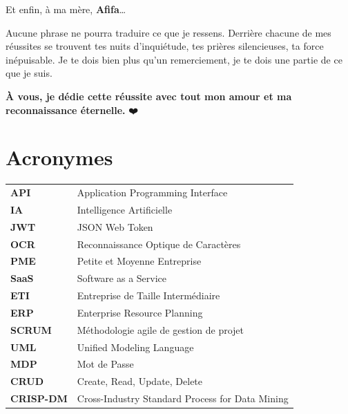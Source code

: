 \documentclass[12pt,a4paper]{report}
\begin{document}
\begin{center}
\vspace{0.3cm}

Et enfin, à ma mère, \textbf{Afifa}…

Aucune phrase ne pourra traduire ce que je ressens. Derrière chacune de mes réussites se trouvent tes nuits d’inquiétude, tes prières silencieuses, ta force inépuisable. Je te dois bien plus qu’un remerciement, je te dois une partie de ce que je suis.

\vspace{0.3cm}

\textbf{À vous, je dédie cette réussite avec tout mon amour et ma reconnaissance éternelle.} ❤️

\end{center}

\clearpage

\tableofcontents
\clearpage
\listoffigures
\clearpage
\listoftables
\clearpage

\chapter*{Acronymes}
\begin{tabular}{ll}
\textbf{API} & Application Programming Interface \\
\textbf{IA} & Intelligence Artificielle \\
\textbf{JWT} & JSON Web Token \\
\textbf{OCR} & Reconnaissance Optique de Caractères \\
\textbf{PME} & Petite et Moyenne Entreprise \\
\textbf{SaaS} & Software as a Service \\
\textbf{ETI} & Entreprise de Taille Intermédiaire \\
\textbf{ERP} & Enterprise Resource Planning \\
\textbf{SCRUM} & Méthodologie agile de gestion de projet \\
\textbf{UML} & Unified Modeling Language \\
\textbf{MDP} & Mot de Passe \\
\textbf{CRUD} & Create, Read, Update, Delete \\
\textbf{CRISP-DM} & Cross-Industry Standard Process for Data Mining \\
\end{tabular}
\clearpage


\setcounter{page}{1}
\end{document}

